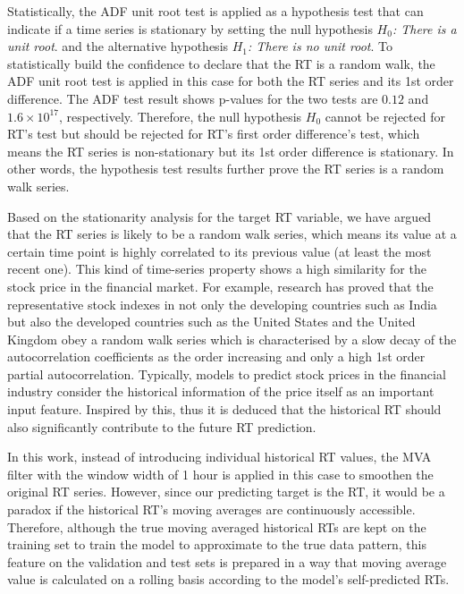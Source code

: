 \documentclass[11pt]{article}
\begin{document}
    Statistically, the ADF unit root test is applied as a hypothesis test that can indicate if a time series is stationary by setting the null hypothesis \textit{$H_0$: There is a unit root}. and the alternative hypothesis \textit{$H_1$: There is no unit root}. To statistically build the confidence to declare that the RT is a random walk, the ADF unit root test is applied in this case for both the RT series and its 1st order difference. The ADF test result shows p-values for the two tests are $0.12$ and $1.6\times10^{17}$, respectively. Therefore, the null hypothesis \textit{$H_0$} cannot be rejected for RT’s test but should be rejected for RT’s first order difference’s test, which means the RT series is non-stationary but its 1st order difference is stationary. In other words, the hypothesis test results further prove the RT series is a random walk series.

    Based on the stationarity analysis for the target RT variable, we have argued that the RT series is likely to be a random walk series, which means its value at a certain time point is highly correlated to its previous value (at least the most recent one). This kind of time-series property shows a high similarity for the stock price in the financial market. For example, research\citep{agwuegbo2010random} has proved that the representative stock indexes in not only the developing countries such as India but also the developed countries such as the United States and the United Kingdom obey a random walk series which is characterised by a slow decay of the autocorrelation coefficients as the order increasing and only a high 1st order partial autocorrelation. Typically, models to predict stock prices in the financial industry consider the historical information of the price itself as an important input feature\cite{ariyo2014stock}\cite{jain2016dynamic}. Inspired by this, thus it is deduced that the historical RT should also significantly contribute to the future RT prediction.
    
    In this work, instead of introducing individual historical RT values, the MVA filter with the window width of 1 hour is applied in this case to smoothen the original RT series. However, since our predicting target is the RT, it would be a paradox if the historical RT’s moving averages are continuously accessible. Therefore, although the true moving averaged historical RTs are kept on the training set to train the model to approximate to the true data pattern, this feature on the validation and test sets is prepared in a way that moving average value is calculated on a rolling basis according to the model’s self-predicted RTs.
\end{document}
